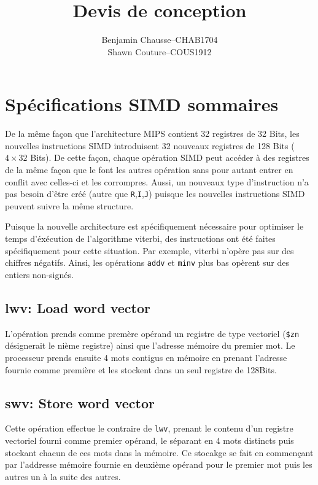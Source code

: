 \documentclass[a11paper]{article}
\title{Devis de conception}
\author{
  \addtolength{\tabcolsep}{-0.4em}
  \begin{tabular}{rcl} %
      Benjamin Chausse & -- & CHAB1704 \\
      Shawn Couture    & -- & COUS1912 \\
  \end{tabular}
}
\begin{document}
\maketitle
\newpage
\tableofcontents
\newpage

\section{Spécifications SIMD sommaires}

De la même façon que l'architecture MIPS contient 32 registres de 32 Bits, les
nouvelles instructions SIMD introduisent 32 nouveaux registres de 128 Bits
($4\times32$ Bits). De cette façon, chaque opération SIMD peut accéder à des
registres de la même façon que le font les autres opération sans pour autant
entrer en conflit avec celles-ci et les corrompres. Aussi, un nouveaux type
d'instruction n'a pas besoin d'être créé (autre que \verb|R|,\verb|I|,\verb|J|)
puisque les nouvelles instructions SIMD peuvent suivre la même structure.

Puisque la nouvelle architecture est spécifiquement nécessaire pour optimiser
le temps d'éxécution de l'algorithme viterbi, des instructions ont été faites
spécifiquement pour cette situation. Par exemple, viterbi n'opère pas sur des
chiffres négatifs. Ainsi, les opérations \verb|addv| et \verb|minv| plus bas
opèrent sur des entiers non-signés.

\subsection{lwv: Load word vector}

L'opération prends comme premère opérand un registre de type vectoriel
(\verb|$zn| désignerait le nième registre) ainsi que l'adresse mémoire du
premier mot. Le processeur prends ensuite 4 mots contigus en mémoire en prenant
l'adresse fournie comme première et les stockent dans un seul registre de
128Bits.

\subsection{swv: Store word vector}

Cette opération effectue le contraire de \verb|lwv|, prenant le contenu d'un
registre vectoriel fourni comme premier opérand, le séparant en 4 mots
distincts puis stockant chacun de ces mots dans la mémoire. Ce stocakge se fait
en commençant par l'addresse mémoire fournie en deuxième opérand pour le
premier mot puis les autres un à la suite des autres.
\end{document}

